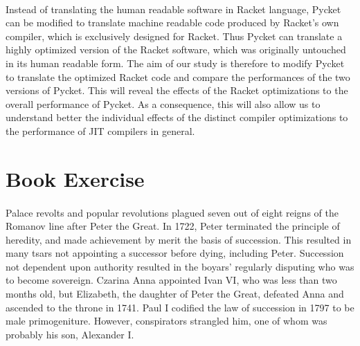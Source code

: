 \documentclass{article}
\begin{document}
\paragraph{} Instead of translating the human readable software in Racket language,
Pycket can be modified to translate machine readable code produced by
Racket's own compiler, which is exclusively designed for Racket. Thus
Pycket can translate a highly optimized version of the Racket
software, which was originally untouched in its human readable
form. The aim of our study is therefore to modify Pycket to translate
the optimized Racket code and compare the performances of the two
versions of Pycket. This will reveal the effects of the Racket
optimizations to the overall performance of Pycket. As a consequence,
this will also allow us to understand better the individual effects of
the distinct compiler optimizations to the performance of JIT
compilers in general.


\section{Book Exercise}

\paragraph{} Palace revolts and popular revolutions plagued seven out of eight
reigns of the Romanov line after Peter the Great. In 1722, Peter
terminated the principle of heredity, and made achievement by merit
the basis of succession. This resulted in many tsars not appointing a
successor before dying, including Peter. Succession not dependent upon
authority resulted in the boyars' regularly disputing who was to
become sovereign. Czarina Anna appointed Ivan VI, who was less than
two months old, but Elizabeth, the daughter of Peter the Great,
defeated Anna and ascended to the throne in 1741. Paul I codified the
law of succession in 1797 to be male primogeniture. However,
conspirators strangled him, one of whom was probably his son,
Alexander I.



\end{document}
